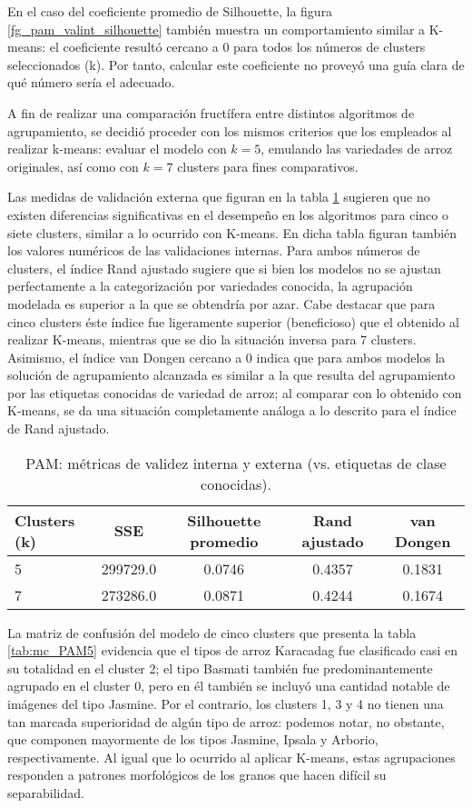 \documentclass{article}
\begin{document}
En el caso del coeficiente promedio de Silhouette, la figura \ref{fg_pam_valint_silhouette} también muestra un comportamiento similar a K-means: el coeficiente resultó cercano a 0 para todos los números de clusters seleccionados (k).
Por tanto, calcular este coeficiente no proveyó una guía clara de qué número sería el adecuado.

A fin de realizar una comparación fructífera entre distintos algoritmos de agrupamiento, se decidió proceder con los mismos criterios que los empleados al realizar k-means: evaluar el modelo con \(k = 5\), emulando las variedades de arroz originales, así como con \(k = 7\) clusters para fines comparativos. 

Las medidas de validación externa que figuran en la tabla \ref{tab:PAM} sugieren que no existen diferencias significativas en el desempeño en los algoritmos para cinco o siete clusters, similar a lo ocurrido con K-means.
En dicha tabla figuran también los valores numéricos de las validaciones internas.
Para ambos números de clusters, el índice Rand ajustado sugiere que si bien los modelos no se ajustan perfectamente a la categorización por variedades conocida, la agrupación modelada es superior a la que se obtendría por azar. Cabe destacar que para cinco clusters éste índice fue ligeramente superior (beneficioso) que el obtenido al realizar K-means, mientras que se dio la situación inversa para 7 clusters.
Asimismo, el índice van Dongen cercano a 0 indica que para ambos modelos la solución de agrupamiento alcanzada es similar a la que resulta del agrupamiento por las etiquetas conocidas de variedad de arroz; al comparar con lo obtenido con K-means, se da una situación completamente análoga a lo descrito para el índice de Rand ajustado.

\begin{table}[!htb]
  \centering
  \begin{tabular}{lcccc}
    \toprule
    Clusters (k) & SSE & Silhouette promedio & Rand ajustado & van Dongen\\
    \midrule
    5 &  299729.0 &  0.0746&  0.4357& 0.1831\\ 
    7 &  273286.0&  0.0871&  0.4244& 0.1674\\
    \bottomrule
  \end{tabular}
  \caption{PAM: métricas de validez interna y externa (vs. etiquetas de clase conocidas).}
  \label{tab:PAM}
\end{table}

La matriz de confusión del modelo de cinco clusters que presenta la tabla \ref{tab:mc_PAM5} evidencia que el tipos de arroz Karacadag fue clasificado casi en su totalidad en el cluster 2;  el tipo Basmati también fue predominantemente agrupado en el cluster 0, pero en él también se incluyó una cantidad notable de imágenes del tipo Jasmine.
Por el contrario, los clusters 1, 3 y 4 no tienen una tan marcada superioridad de algún tipo de arroz: podemos notar, no obstante, que componen mayormente de los tipos Jasmine, Ipsala y Arborio, respectivamente. Al igual que lo ocurrido al aplicar K-means, estas agrupaciones responden a patrones morfológicos de los granos que hacen difícil su separabilidad.
\end{document}
